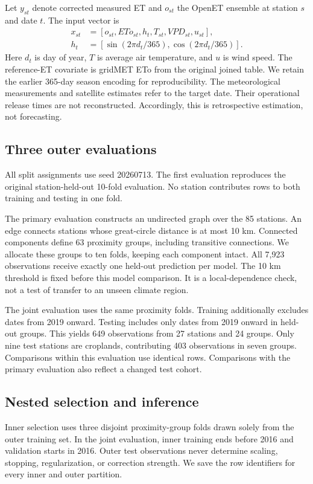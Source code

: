 \documentclass[10pt,letterpaper]{article}
\begin{document}
Let $y_{st}$ denote corrected measured ET and $o_{st}$ the OpenET ensemble at station $s$ and date $t$.
The input vector is
\begin{equation}
\begin{aligned}
x_{st}&=[o_{st},ETo_{st},h_t,T_{st},VPD_{st},u_{st}],\\
h_t&=[\sin(2\pi d_t/365),\cos(2\pi d_t/365)].
\end{aligned}
\end{equation}
Here $d_t$ is day of year, $T$ is average air temperature, and $u$ is wind speed.
The reference-ET covariate is gridMET ETo from the original joined table.
We retain the earlier 365-day season encoding for reproducibility.
The meteorological measurements and satellite estimates refer to the target date.
Their operational release times are not reconstructed.
Accordingly, this is retrospective estimation, not forecasting.

\subsection{Three outer evaluations}
All split assignments use seed 20260713.
The first evaluation reproduces the original station-held-out 10-fold evaluation.
No station contributes rows to both training and testing in one fold.

The primary evaluation constructs an undirected graph over the 85 stations.
An edge connects stations whose great-circle distance is at most 10 km.
Connected components define 63 proximity groups, including transitive connections.
We allocate these groups to ten folds, keeping each component intact.
All 7,923 observations receive exactly one held-out prediction per model.
The 10 km threshold is fixed before this model comparison.
It is a local-dependence check, not a test of transfer to an unseen climate region.

The joint evaluation uses the same proximity folds.
Training additionally excludes dates from 2019 onward.
Testing includes only dates from 2019 onward in held-out groups.
This yields 649 observations from 27 stations and 24 groups.
Only nine test stations are croplands, contributing 403 observations in seven groups.
Comparisons within this evaluation use identical rows.
Comparisons with the primary evaluation also reflect a changed test cohort.

\subsection{Nested selection and inference}
Inner selection uses three disjoint proximity-group folds drawn solely from the outer training set.
In the joint evaluation, inner training ends before 2016 and validation starts in 2016.
Outer test observations never determine scaling, stopping, regularization, or correction strength.
We save the row identifiers for every inner and outer partition.
\end{document}
